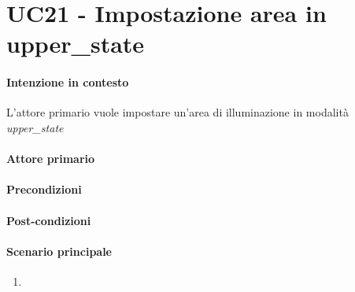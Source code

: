 \section{UC21 - Impostazione area in upper\_state}\label{uc:21}
\paragraph{Intenzione in contesto} L'attore primario vuole impostare un'area di illuminazione in modalità \textit{upper\_state}
\paragraph{Attore primario}
\paragraph{Precondizioni}
\paragraph{Post-condizioni}
\paragraph{Scenario principale}
\begin{enumerate}
    \item 
\end{enumerate}